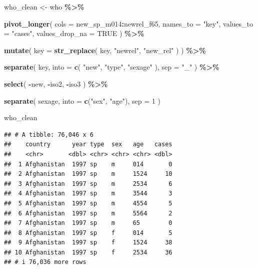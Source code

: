 \documentclass[
  11pt,
  oneside]{book}
\newenvironment{Shaded}{\begin{snugshade}}{\end{snugshade}}
\newcommand{\AttributeTok}[1]{\textcolor[rgb]{0.13,0.29,0.53}{#1}}
\newcommand{\ConstantTok}[1]{\textcolor[rgb]{0.56,0.35,0.01}{#1}}
\newcommand{\DecValTok}[1]{\textcolor[rgb]{0.00,0.00,0.81}{#1}}
\newcommand{\FunctionTok}[1]{\textcolor[rgb]{0.13,0.29,0.53}{\textbf{#1}}}
\newcommand{\NormalTok}[1]{#1}
\newcommand{\OtherTok}[1]{\textcolor[rgb]{0.56,0.35,0.01}{#1}}
\newcommand{\SpecialCharTok}[1]{\textcolor[rgb]{0.81,0.36,0.00}{\textbf{#1}}}
\newcommand{\StringTok}[1]{\textcolor[rgb]{0.31,0.60,0.02}{#1}}
\begin{document}
\begin{Shaded}
\begin{Highlighting}[]
\NormalTok{who\_clean }\OtherTok{\textless{}{-}}\NormalTok{ who }\SpecialCharTok{\%\textgreater{}\%}
  
  \FunctionTok{pivot\_longer}\NormalTok{(}
    \AttributeTok{cols =}\NormalTok{ new\_sp\_m014}\SpecialCharTok{:}\NormalTok{newrel\_f65,}
    \AttributeTok{names\_to =} \StringTok{"key"}\NormalTok{,}
    \AttributeTok{values\_to =} \StringTok{"cases"}\NormalTok{,}
    \AttributeTok{values\_drop\_na =} \ConstantTok{TRUE}
\NormalTok{  ) }\SpecialCharTok{\%\textgreater{}\%}
  
  \FunctionTok{mutate}\NormalTok{(}
    \AttributeTok{key =} \FunctionTok{str\_replace}\NormalTok{(}
\NormalTok{      key,}
      \StringTok{"newrel"}\NormalTok{,}
      \StringTok{"new\_rel"}
\NormalTok{    )}
\NormalTok{  ) }\SpecialCharTok{\%\textgreater{}\%}
  
  \FunctionTok{separate}\NormalTok{(}
\NormalTok{    key,}
    \AttributeTok{into =} \FunctionTok{c}\NormalTok{(}
      \StringTok{"new"}\NormalTok{,}
      \StringTok{"type"}\NormalTok{,}
      \StringTok{"sexage"}
\NormalTok{    ),}
    \AttributeTok{sep =} \StringTok{"\_"}
\NormalTok{  ) }\SpecialCharTok{\%\textgreater{}\%}
  
  \FunctionTok{select}\NormalTok{(}
    \SpecialCharTok{{-}}\NormalTok{new,}
    \SpecialCharTok{{-}}\NormalTok{iso2,}
    \SpecialCharTok{{-}}\NormalTok{iso3}
\NormalTok{  ) }\SpecialCharTok{\%\textgreater{}\%}
  
  \FunctionTok{separate}\NormalTok{(}
\NormalTok{    sexage,}
    \AttributeTok{into =} \FunctionTok{c}\NormalTok{(}\StringTok{"sex"}\NormalTok{, }\StringTok{"age"}\NormalTok{),}
    \AttributeTok{sep =} \DecValTok{1}
\NormalTok{  )}

\NormalTok{who\_clean}
\end{Highlighting}
\end{Shaded}

\begin{verbatim}
## # A tibble: 76,046 x 6
##    country      year type  sex   age   cases
##    <chr>       <dbl> <chr> <chr> <chr> <dbl>
##  1 Afghanistan  1997 sp    m     014       0
##  2 Afghanistan  1997 sp    m     1524     10
##  3 Afghanistan  1997 sp    m     2534      6
##  4 Afghanistan  1997 sp    m     3544      3
##  5 Afghanistan  1997 sp    m     4554      5
##  6 Afghanistan  1997 sp    m     5564      2
##  7 Afghanistan  1997 sp    m     65        0
##  8 Afghanistan  1997 sp    f     014       5
##  9 Afghanistan  1997 sp    f     1524     38
## 10 Afghanistan  1997 sp    f     2534     36
## # i 76,036 more rows
\end{verbatim}
\end{document}
